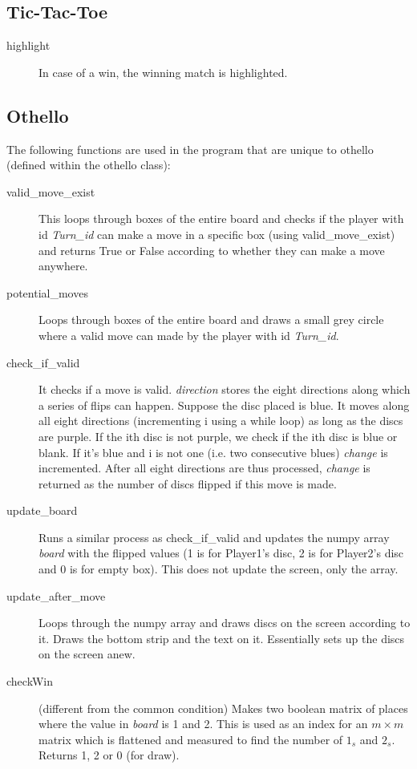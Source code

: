 \documentclass[12pt]{article}
\begin{document}
\subsection{Tic-Tac-Toe}
\begin{description}
    \item[highlight] In case of a win, the winning match is highlighted. 
\end{description}

\subsection{Othello}
The following functions are used in the program that are unique to othello (defined within the othello class):
\begin{description}
    \item[valid\_move\_exist] This loops through boxes of the entire board and checks if the player with id \textit{Turn\_id} can make a move in a specific box (using valid\_move\_exist) and returns True or False according to whether they can make a move anywhere.
    \item[potential\_moves] Loops through boxes of the entire board and draws a small grey circle where a valid move can made by the player with id \textit{Turn\_id}.
    \item[check\_if\_valid] It checks if a move is valid. \textit{direction} stores the eight directions along which a series of flips can happen. Suppose the disc placed is blue. It moves along all eight directions (incrementing i using a while loop) as long as the discs are purple. If the ith disc is not purple, we check if the ith disc is blue or blank. If it's blue and i is not one (i.e. two consecutive blues) \textit{change} is incremented. After all eight directions are thus processed, \textit{change} is returned as the number of discs flipped if this move is made. 
    \item[update\_board] Runs a similar process as check\_if\_valid and updates the numpy array \textit{board} with the flipped values (1 is for Player1's disc, 2 is for Player2's disc and 0 is for empty box). This does not update the screen, only the array. 
    \item[update\_after\_move] Loops through the numpy array and draws discs on the screen according to it. Draws the bottom strip and the text on it. Essentially sets up the discs on the screen anew. 
    \item[checkWin] (different from the common condition) Makes two boolean matrix of places where the value in \textit{board} is 1 and 2. This is used as an index for an $m \times m$ matrix which is flattened and measured to find the number of $1_{s}$ and $2_{s}$. Returns 1, 2 or 0 (for draw).    

\end{description}
\end{document}
